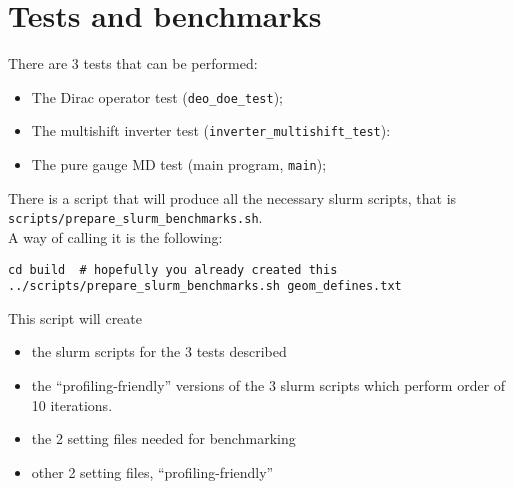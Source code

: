 
\section{Tests and benchmarks}
\label{tests_and_benchmarks}

There are 3 tests that can be performed:
\begin{itemize}
 \item The Dirac operator test (\verb|deo_doe_test|);
 \item The multishift inverter test (\verb|inverter_multishift_test|):
 \item The pure gauge MD test (main program, \verb|main|);
\end{itemize}

There is a script that will produce all the necessary slurm scripts, that is \\
\verb|scripts/prepare_slurm_benchmarks.sh|. \\ A way of calling it is the following:
\begin{verbatim}
cd build  # hopefully you already created this
../scripts/prepare_slurm_benchmarks.sh geom_defines.txt
\end{verbatim}
This script will create 
\begin{itemize}
 \item the slurm scripts for the 3 tests described
 \item the ``profiling-friendly'' versions of the 3 slurm scripts which perform order of 10 iterations.
 \item the 2 setting files needed for benchmarking
 \item other 2 setting files, ``profiling-friendly''
\end{itemize}

